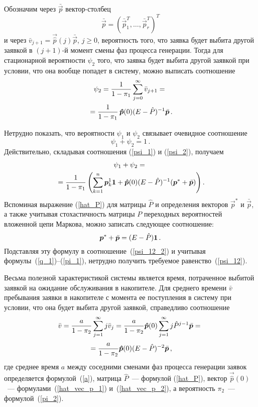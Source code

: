 \begin{multicols}{2}
Обозначим через $\bar{\vec{p}}$ вектор-столбец 
$$
\bar{\vec{p}}= (\bar{\vec{p}}_1^{T}, \ldots, \bar{\vec{p}}_r^{T})^{T}
$$
и через $\bar v_{j+1}=\vec{\hat p}(j) \bar{\vec{p}}$, $j\ge 0$, вероятность того,
что заявка будет выбита другой заявкой в $(j+1)$-й момент смены фаз процесса генерации.
Тогда для стационарной вероятности $\psi_2$ того, что заявка будет выбита другой заявкой при условии,
что она вообще попадет в систему, можно выписать соотношение
\begin{multline}
\psi_2=\fr{1}{1-\pi_1}\sum\limits_{j=0}^{\infty} \bar v_{j+1}={}\\
{}=
\fr{1}{1-\pi_1}\,\vec{\hat p}(0) (E-\hat P)^{-1} \bar{\vec{p}}\,.\label{psi_2}
\end{multline}

Нетрудно показать, что вероятности $\psi_1$ и $\psi_2$ связывает очевидное соотношение
\begin{equation}
\label{psi_12}
\psi_1+\psi_2=1\,.
\end{equation}
Действительно, складывая соотношения (\ref{psi_1}) и (\ref{psi_2}), получаем
\begin{multline}
\psi_1+\psi_2={}\\
\hspace*{-5pt} {}= \fr{1}{ 1-\pi_1}\left(\sum\limits_{k=1}^{n} \vec{p}^1_{k}{\bf 1}+
\vec{\hat p}(0) (E-\hat P)^{-1} (\vec{p}^*+\bar{\vec{p}})\right).\!\!\!\label{psi_12_2}
\end{multline}
Вспоминая выражение (\ref{hat_P}) для матрицы $\hat P$ и определения векторов $\vec{p}^*$ и $\bar{\vec{p}}$,
а также учитывая стохастичность матрицы $P$ переходных вероятностей вложенной цепи Маркова,
можно записать следующее соотношение:
$$
\vec{p}^* + \bar{\vec{p}}=(E-\hat P){\bf 1}\,.
$$
Подставляя эту формулу в соотношение~(\ref{psi_12_2}) и учитывая формулы~(\ref{q_1})--(\ref{pi_1}),
нетрудно получить требуемое равенство~(\ref{psi_12}).


Весьма полезной характеристикой системы является время, потраченное выбитой заявкой
на ожидание обслуживания в накопителе.
Для среднего времени $\bar v$ пребывания заявки в накопителе с момента ее поступления в систему при условии,
что она будет выбита другой заявкой, справедливо соотношение
\begin{multline*}
\bar v =\fr{a}{1-\pi_2} \sum_{j=1}^{\infty}j\bar v_j =
\fr{a}{ 1-\pi_2} \vec{\hat p}(0) \sum_{j=1}^{\infty} j\hat P^{j-1} \bar{\vec{p}}={}\\
{}=
\fr{a}{ 1- \pi_2} \vec{\hat p}(0) (E-\hat P)^{-2} \bar{\vec{p}}\,,
\end{multline*}
где среднее время $a$ между соседними сменами фаз процесса генерации заявок определяется формулой~(\ref{a}),
матрица $\hat P$~--- формулой (\ref{hat_P}), вектор $\vec{\hat p}(0)$~---
формулами~(\ref{hat_vec_p_1}) и~(\ref{hat_vec_p_2}), а вероятность $\pi_2$~---  формулой~(\ref{pi_2}).


\end{multicols}
